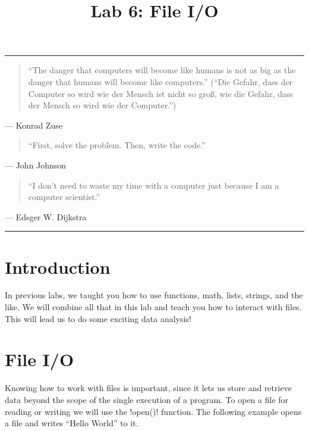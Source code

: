 \documentclass[11pt]{cselabheader}
\title{Lab 6: File I/O}
\begin{document}
\maketitle

\hrule
\begin{quotation}
``The danger that computers will become like humans is not as big as the danger
that humans will become like computers.'' (``Die Gefahr, dass der Computer so
wird wie der Mensch ist nicht so gro\ss, wie die Gefahr, dass der Mensch so wird
wie der Computer.'')
\end{quotation}
\begin{flushright}
--- Konrad Zuse
\end{flushright}

\begin{quotation}
	``First, solve the problem. Then, write the code.''
\end{quotation}
\begin{flushright}
	--- John Johnson
\end{flushright}

\begin{quotation}
``I don’t need to waste my time with a computer just because I am a computer
scientist.''
\end{quotation}
\begin{flushright}
--- Edsger W. Dijkstra
\end{flushright}

\hrule

\section*{Introduction}

In previous labs, we taught you how to use functions, math, lists, strings, and
the like. We will combine all that in this lab and teach you how to interact
with files. This will lead us to do some exciting data analysis!

\pagebreak

\tableofcontents

\pagebreak
{}
\section{File I/O}
Knowing how to work with files is important, since it lets us store and retrieve
data beyond the scope of the single execution of a program. To open a file for
reading or writing we will use the \pythoninline!open()! function. The following
example opens a file and writes ``Hello World'' to it.
\end{document}
